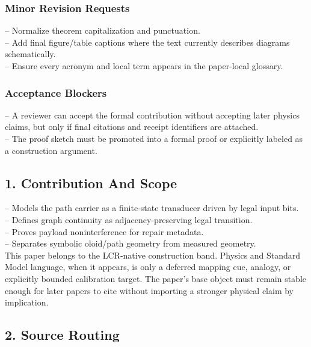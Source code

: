 \documentclass[11pt]{article}
\begin{document}
\subsubsection*{Minor Revision Requests}

\noindent{}-- Normalize theorem capitalization and punctuation.\\
\noindent{}-- Add final figure/table captions where the text currently describes diagrams schematically.\\
\noindent{}-- Ensure every acronym and local term appears in the paper-local glossary.\\

\subsubsection*{Acceptance Blockers}

\noindent{}-- A reviewer can accept the formal contribution without accepting later physics claims, but only if final citations and receipt identifiers are attached.\\
\noindent{}-- The proof sketch must be promoted into a formal proof or explicitly labeled as a construction argument.\\


\subsection*{1. Contribution And Scope}

\noindent{}-- Models the path carrier as a finite-state transducer driven by legal input bits.\\
\noindent{}-- Defines graph continuity as adjacency-preserving legal transition.\\
\noindent{}-- Proves payload noninterference for repair metadata.\\
\noindent{}-- Separates symbolic oloid/path geometry from measured geometry.\\

This paper belongs to the LCR-native construction band. Physics and Standard Model language, when it appears, is only a deferred mapping cue, analogy, or explicitly bounded calibration target. The paper's base object must remain stable enough for later papers to cite without importing a stronger physical claim by implication.

\subsection*{2. Source Routing}
\end{document}
